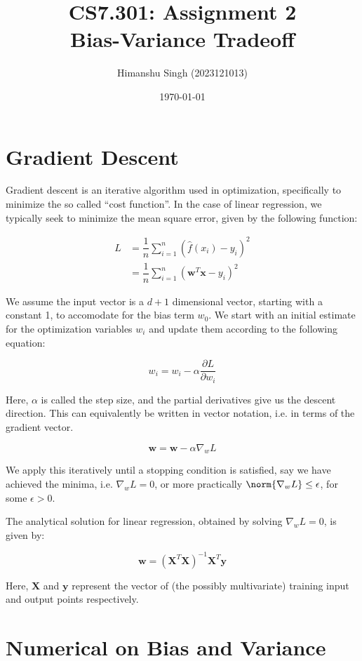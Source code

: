 \documentclass[a4paper]{myarticle}
\title{%
  CS7.301: Assignment 2 \\
  \Large Bias-Variance Tradeoff}
\author{Himanshu Singh (2023121013)}
\date{\today}
\begin{document}
\maketitle

\section{Gradient Descent}

Gradient descent is an iterative algorithm used in optimization, specifically to minimize the so called ``cost function''. In the case of linear regression, we typically seek to minimize the mean square error, given by the following function:

\begin{align*}
L & = \dfrac{1}{n}\sum_{i=1}^{n} (\hat{f}(x_i) - y_i)^2 \\
& = \dfrac{1}{n}\sum_{i=1}^{n} (\textbf{w}^T\textbf{x} - y_i)^2
\end{align*}

We assume the input vector is a $d+1$ dimensional vector, starting with a constant 1, to accomodate for the bias term $w_0$. We start with an initial estimate for the optimization variables ${w_i}$ and update them according to the following equation:

$$w_i = w_i - \alpha\dfrac{\partial L}{\partial w_i}$$

Here, $\alpha$ is called the step size, and the partial derivatives give us the descent direction. This can equivalently be written in vector notation, i.e. in terms of the gradient vector.

$$\textbf{w} = \textbf{w} - \alpha\nabla_w L$$

We apply this iteratively until a stopping condition is satisfied, say we have achieved the minima, i.e. $\nabla_w L = 0$, or more practically  $\norm{\nabla_w L} \leq \epsilon$, for some $\epsilon > 0$.

The analytical solution for linear regression, obtained by solving $\nabla_w L = 0$, is given by:

$$\textbf{w} = (\textbf{X}^T\textbf{X})^{-1} \textbf{X}^T\textbf{y}$$

Here, $\textbf{X}$ and $\textbf{y}$ represent the vector of (the possibly multivariate) training input and output points respectively.

\section{Numerical on Bias and Variance}
\end{document}
